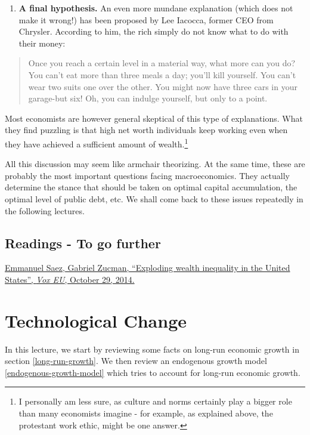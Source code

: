 \documentclass[]{book}
\providecommand{\tightlist}{%
  \setlength{\itemsep}{0pt}\setlength{\parskip}{0pt}}
\let\rmarkdownfootnote\footnote%
\def\footnote{\protect\rmarkdownfootnote}
\theoremstyle{definition}
\theoremstyle{definition}
\theoremstyle{definition}
\theoremstyle{remark}
\begin{document}
\begin{enumerate}
\def\labelenumi{\arabic{enumi}.}
\setcounter{enumi}{4}
\tightlist
\item
  \textbf{A final hypothesis.} An even more mundane explanation (which
  does not make it wrong!) has been proposed by Lee Iacocca, former CEO
  from Chrysler. According to him, the rich simply do not know what to
  do with their money:
\end{enumerate}

\begin{quote}
Once you reach a certain level in a material way, what more can you do?
You can't eat more than three meals a day; you'll kill yourself. You
can't wear two suits one over the other. You might now have three cars
in your garage-but six! Oh, you can indulge yourself, but only to a
point.
\end{quote}

Most economists are however general skeptical of this type of
explanations. What they find puzzling is that high net worth individuals
keep working even when they have achieved a sufficient amount of
wealth.\footnote{I personally am less sure, as culture and norms
  certainly play a bigger role than many economists imagine - for
  example, as explained above, the protestant work ethic, might be one
  answer.}

All this discussion may seem like armchair theorizing. At the same time,
these are probably the most important questions facing macroeconomics.
They actually determine the stance that should be taken on optimal
capital accumulation, the optimal level of public debt, etc. We shall
come back to these issues repeatedly in the following lectures.

\section*{Readings - To go further}\label{readings---to-go-further-3}

\href{https://voxeu.org/article/exploding-wealth-inequality-united-states}{Emmanuel
Saez, Gabriel Zucman, ``Exploding wealth inequality in the United
States'', \emph{Vox EU}, October 29, 2014.}

\chapter{Technological Change}\label{technology}

In this lecture, we start by reviewing some facts on long-run economic
growth in section \ref{long-run-growth}. We then review an endogenous
growth model \ref{endogenous-growth-model} which tries to account for
long-run economic growth.
\end{document}
